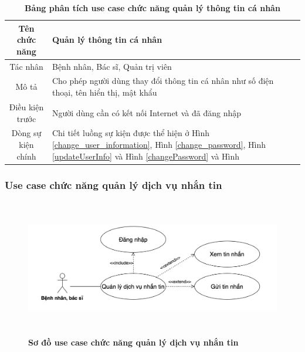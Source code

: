   \begin{table}[H]
    \caption{\bfseries \fontsize{12pt}{0pt}\selectfont Bảng phân tích use case chức năng quản lý thông tin cá nhân}
    \centering
    \begin{tabularx}{0.9\textwidth}{|c|X|}
      \hline
      \textbf{Tên chức năng} & \textbf{Quản lý thông tin cá nhân} \\
      \hline
      Tác nhân & Bệnh nhân, Bác sĩ, Quản trị viên \\
      \hline
      Mô tả & Cho phép người dùng thay đổi thông tin cá nhân như số điện thoại, tên hiển thị, mật khẩu \\
      \hline
      Điều kiện trước & Người dùng cần có kết nối Internet và đã đăng nhập \\
      \hline
      Dòng sự kiện chính & 
        Chi tiết luồng sự kiện được thể hiện ở Hình \ref{change_user_information}, Hình \ref{change_password}, 
        Hình \ref{updateUserInfo} và Hình \ref{changePassword}
        và Hình\\
      \hline
    \end{tabularx}
  \end{table}

\subsubsection{Use case chức năng quản lý dịch vụ nhắn tin}
  \begin{figure}[H]
    \centering
    \includegraphics[width=15cm,height=6cm]{Images/use_case/use_case_send_receive_message.png}
    \caption[Sơ đồ use case chức năng quản lý dịch vụ nhắn tin]{\bfseries \fontsize{12pt}{0pt}
    \selectfont Sơ đồ use case chức năng quản lý dịch vụ nhắn tin}
    \label{use_case_send_receive_message} %
  \end{figure}

